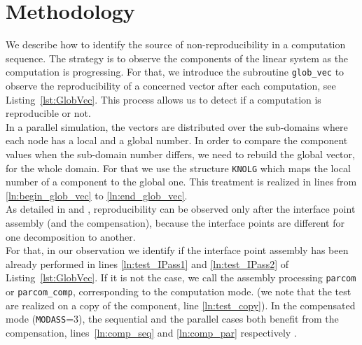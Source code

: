 \section{Methodology}
\label{sec:methodology}
%
We describe how to identify the source of
non-reproducibility in a computation sequence.
The strategy is to observe the components
of the linear system as the computation is progressing.
For that, we introduce the subroutine \texttt{glob\_vec}
to observe the reproducibility of a concerned vector after each computation,
see Listing~\ref{lst:GlobVec}.
This process allows us to detect if a computation is reproducible or not.\\
%
In a parallel simulation, the vectors are distributed over the sub-domains where each
node has a local and a global number.
In order to compare the component values when the sub-domain number differs,
we need to rebuild the global vector, \ie for the whole domain.
For that we use the structure \texttt{KNOLG} which maps the local number of a component
to the global one.
This treatment is realized in
lines from \ref{ln:begin_glob_vec} to \ref{ln:end_glob_vec}.\\
%
As detailed in \cite{LaND15} and \cite{LaND16}, reproducibility can be observed
only after the interface point assembly (and the compensation), because
the interface points are different for one
decomposition to another.\\
For that, in our observation we identify if the interface point assembly
has been already performed in lines \ref{ln:test_IPass1} and \ref{ln:test_IPass2}
of Listing~\ref{lst:GlobVec}. If it is not the case, we call the assembly processing \texttt{parcom}
or \texttt{parcom\_comp}, corresponding to the computation mode.
(we note that the test are realized on a copy of the component, line \ref{ln:test_copy}).
In the compensated mode (\texttt{MODASS}=3), the sequential and
the parallel cases both benefit from the compensation, lines~\ref{ln:comp_seq} and \ref{ln:comp_par} respectively .

